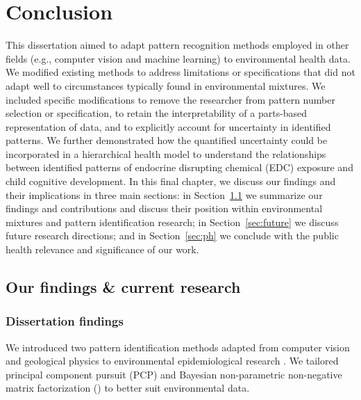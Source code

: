 \chapter{Conclusion}\label{sec:conclusion}
\clearpage
This dissertation aimed to adapt pattern recognition methods employed in other fields (e.g., computer vision and machine learning) to environmental health data. We modified existing methods to address limitations or specifications that did not adapt well to circumstances typically found in environmental mixtures.  We included specific modifications to remove the researcher from pattern number selection or specification, to retain the interpretability of a parts-based representation of data, and to explicitly account for uncertainty in identified patterns. We further demonstrated how the quantified uncertainty could be incorporated in a hierarchical health model to understand the relationships between identified patterns of endocrine disrupting chemical (EDC) exposure and child cognitive development. In this final chapter, we discuss our findings and their implications in three main sections: in Section~\ref{sec:summarize} we summarize our findings and contributions and discuss their position within environmental mixtures and pattern identification research; in Section~\ref{sec:future} we discuss future research directions; and in Section~\ref{sec:ph} we conclude with the public health relevance and significance of our work.

\section{Our findings \& current research}\label{sec:summarize}

\subsection{Dissertation findings}\label{sec:findings}
We introduced two pattern identification methods adapted from computer vision and geological physics to environmental epidemiological research \citep{candes2011robust, zhou2010stable, holtzman2018machine}. We tailored principal component pursuit (PCP) and Bayesian non-parametric non-negative matrix factorization (\bnmfc) to better suit environmental data.

